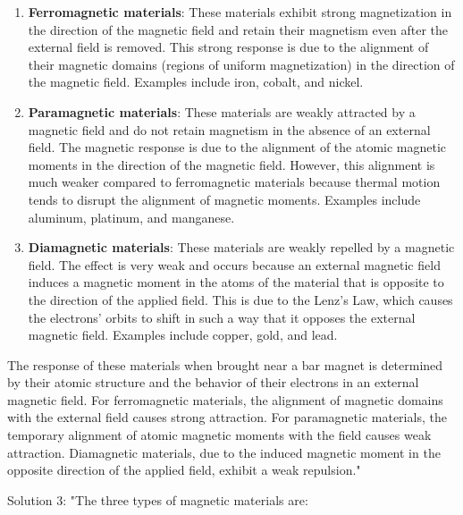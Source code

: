 \begin{enumerate}
    \item \textbf{Ferromagnetic materials}: These materials exhibit strong magnetization in the direction of the magnetic field and retain their magnetism even after the external field is removed. This strong response is due to the alignment of their magnetic domains (regions of uniform magnetization) in the direction of the magnetic field. Examples include iron, cobalt, and nickel.
    \item \textbf{Paramagnetic materials}: These materials are weakly attracted by a magnetic field and do not retain magnetism in the absence of an external field. The magnetic response is due to the alignment of the atomic magnetic moments in the direction of the magnetic field. However, this alignment is much weaker compared to ferromagnetic materials because thermal motion tends to disrupt the alignment of magnetic moments. Examples include aluminum, platinum, and manganese.
    \item \textbf{Diamagnetic materials}: These materials are weakly repelled by a magnetic field. The effect is very weak and occurs because an external magnetic field induces a magnetic moment in the atoms of the material that is opposite to the direction of the applied field. This is due to the Lenz's Law, which causes the electrons' orbits to shift in such a way that it opposes the external magnetic field. Examples include copper, gold, and lead.
\end{enumerate}

The response of these materials when brought near a bar magnet is determined by their atomic structure and the behavior of their electrons in an external magnetic field. For ferromagnetic materials, the alignment of magnetic domains with the external field causes strong attraction. For paramagnetic materials, the temporary alignment of atomic magnetic moments with the field causes weak attraction. Diamagnetic materials, due to the induced magnetic moment in the opposite direction of the applied field, exhibit a weak repulsion."

Solution 3: 
"The three types of magnetic materials are:

